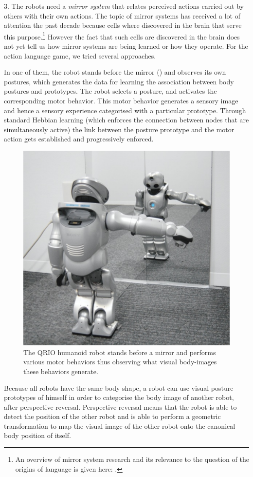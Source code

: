 3. The robots need a {\itshape mirror system} that relates perceived actions carried out by others with their own actions. 
The topic of mirror systems has received a lot of attention the past decade because cells where discovered in the brain 
that serve this purpose.\footnote{
An overview of mirror system research and its relevance to the question of the origins of language is given here: 
\cite{Rizzolatti:1998}.}
However the fact that such cells are discovered in the brain 
does not yet tell us how mirror systems are being learned or how they operate. For the action language game, we tried 
several approaches.

In one of them, the robot stands before the mirror () and observes its own 
postures, which generates the data for learning the association between body postures and prototypes. 
The robot selects a posture, and activates the corresponding motor behavior. This motor behavior generates a sensory image and 
hence a sensory experience categorised with a particular prototype. Through standard Hebbian learning (which enforces the 
connection between nodes that are simultaneously active) the link between the posture prototype and the motor action gets 
established and progressively enforced. 

\begin{figure}
\centerline{\includegraphics[width=0.6\linewidth]{chap11/figs/robot-mirror}}
\caption{\label{robot-mirror} \footnotesize{The QRIO humanoid robot stands before a mirror and performs various motor behaviors thus observing what visual body-images these behaviors generate.}}
\end{figure}

Because all robots have the same body shape, a robot can use visual posture prototypes of 
himself in order to categorise the body image of another robot, after 
perspective reversal. Perspective reversal means that the robot is able to detect the position of the other 
robot and is able to perform a geometric transformation to map the visual image of the other robot onto 
the canonical body position of itself.

